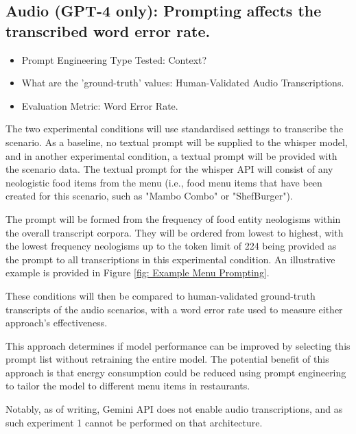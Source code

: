 
\subsection{Audio (GPT-4 only): Prompting affects the transcribed word error rate.}

\begin{itemize}
    \item Prompt Engineering Type Tested: Context?
    \item What are the 'ground-truth' values: Human-Validated Audio Transcriptions.
    \item Evaluation Metric: Word Error Rate.
\end{itemize}

The two experimental conditions will use standardised settings to transcribe the scenario. As a baseline, no textual prompt will be supplied to the whisper model, and in another experimental condition, a textual prompt will be provided with the scenario data. The textual prompt for the whisper API will consist of any neologistic food items from the menu (i.e., food menu items that have been created for this scenario, such as "Mambo Combo" or "ShefBurger"). 

The prompt will be formed from the frequency of food entity neologisms within the overall transcript corpora. They will be ordered from lowest to highest, with the lowest frequency neologisms up to the token limit of 224 being provided as the prompt to all transcriptions in this experimental condition. An illustrative example is provided in Figure \ref{fig: Example Menu Prompting}.

These conditions will then be compared to human-validated ground-truth transcripts of the audio scenarios, with a word error rate used to measure either approach's effectiveness.

This approach determines if model performance can be improved by selecting this prompt list without retraining the entire model. The potential benefit of this approach is that energy consumption could be reduced using prompt engineering to tailor the model to different menu items in restaurants. 

Notably, as of writing, Gemini API does not enable audio transcriptions, and as such experiment 1 cannot be performed on that architecture.


